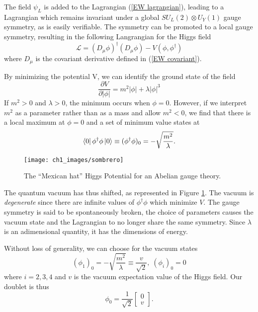 \documentclass[10pt,a4paper]{book}
\begin{document}
The field $\psi_L$ is added to the Lagrangian (\ref{EW lagrangian}), leading to a Lagrangian which remains invariant under a global $SU_L(2)\otimes U_Y(1)$ gauge symmetry, as is easily verifiable. The symmetry can be promoted to a local gauge symmetry, resulting in the following Langrangian for the Higgs field
\begin{equation}
\mathcal{L} = (D_\mu\phi)^\dagger(D_\mu\phi) - V(\phi,\phi^\dagger)
\end{equation}
where $D_\mu$ is the covariant derivative defined in (\ref{EW covariant}).


By minimizing the potential V, we can identify the ground state of the field
\begin{equation}
\frac{\partial V}{\partial \vert \phi \vert} = m^2\vert \phi \vert + \lambda\vert\phi\vert^3 
\end{equation}
If $m^2 > 0$ and $\lambda > 0$, the minimum occurs when $\phi = 0$. However, if we interpret $m^2$ as a parameter rather than as a mass and allow $m^2 < 0$, we find that there is a local maximum at $\phi = 0$ and a set of minimum value states at 
\begin{equation}
\bra{0}\phi^\dagger \phi\ket{0} \equiv (\phi^\dagger\phi)_0 = -\sqrt{\frac{m^2}{\lambda}}.
\end{equation}

\begin{figure}
\centering
\texttt{[image: ch1\_images/sombrero]}
\caption{The ``Mexican hat'' Higgs Potential for an Abelian gauge theory.}
\label{Higgs Potential}
\end{figure}
The quantum vacuum has thus shifted, as represented in Figure \ref{Higgs Potential}. The vacuum is \emph{degenerate} since there are infinite values of $\phi^\dagger\phi$ which minimize $V$. The gauge symmetry is said to be spontaneously broken, the choice of parameters causes the vacuum state and the Lagrangian to no longer share the same symmetry. Since $\lambda$ is an adimensional quantity, it has the dimensions of energy.

Without loss of generality, we can choose for the vacuum states
\begin{equation}
(\phi_1)_0 = -\sqrt{\frac{m^2}{\lambda}} \equiv \frac{v}{\sqrt{2}}, \; (\phi_i)_0 = 0
\end{equation}
where $i = 2,3,4$ and $v$ is the vacuum expectation value of the Higgs field.
Our doublet is thus
\begin{equation}
\phi_0 = \frac{1}{\sqrt{2}}\begin{bmatrix}
0 \\
v
\end{bmatrix}.
\end{equation}
\end{document}

